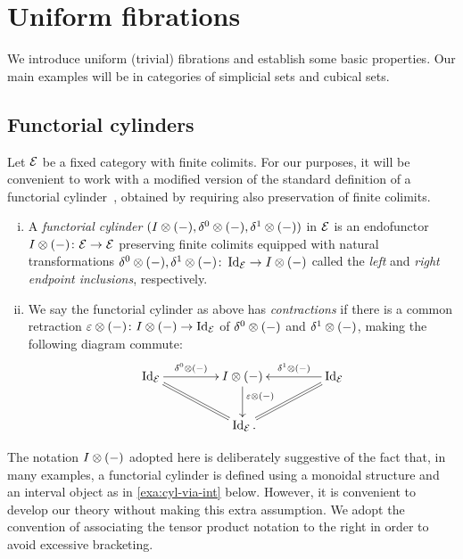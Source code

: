 \documentclass[reqno,10pt,a4paper,oneside,draft]{amsart}
\begin{document}
\section{Uniform fibrations}
\label{sec:unif}

We introduce uniform (trivial) fibrations and establish some basic properties.
Our main examples will be in categories of simplicial sets and cubical sets.

\subsection*{Functorial cylinders}

Let $\mathcal{E}$ be a fixed category with finite colimits.
For our purposes, it will be convenient to work with a modified version of the standard definition of a functorial cylinder~\cite{kamps-porter:homotopy}, obtained by requiring also preservation of finite colimits.

\begin{definition} \hfill
\begin{enumerate}[(i)]
\item A \emph{functorial cylinder} $(I \otimes (-), \delta^0 \otimes (-), \delta^1 \otimes (-))$ in $\mathcal{E}$ is an endofunctor $I \otimes (-) \colon \mathcal{E} \to \mathcal{E}$ preserving finite colimits equipped with natural transformations $\delta^0 \otimes (-), \delta^1 \otimes (-) \colon \operatorname{Id}_{\mathcal{E}} \to I \otimes (-)$ called the \emph{left} and \emph{right endpoint inclusions}, respectively.
\item We say the functorial cylinder as above has \emph{contractions} if there is a common retraction $\varepsilon \otimes (-) \colon I \otimes (-) \to \operatorname{Id}_{\mathcal{E}}$ of $\delta^0 \otimes (-)$ and $\delta^1 \otimes (-)$, making the following diagram commute:
\[
\xymatrix@C+2em{
  \Id_\catE
  \ar[r]^-{\lcyl \otimes (-)}
  \ar@{=}[dr]
&
  \interval \otimes (-)
  \ar[d]^(0.4){\ccyl \otimes (-)}
&
  \Id_\catE
  \ar[l]_-{\rcyl \otimes (-)}
  \ar@{=}[dl]
\\&
  \Id_\catE
\rlap{.}}
\]
\end{enumerate}
\end{definition}

The notation $I \otimes (-)$ adopted here is deliberately suggestive of the fact that, in many examples, a functorial cylinder is defined using a monoidal structure and an interval object as in \cref{exa:cyl-via-int} below.
However, it is convenient to develop our theory without making this extra assumption.
We adopt the convention of associating the tensor product notation to the right in order to avoid excessive bracketing.
\end{document}
